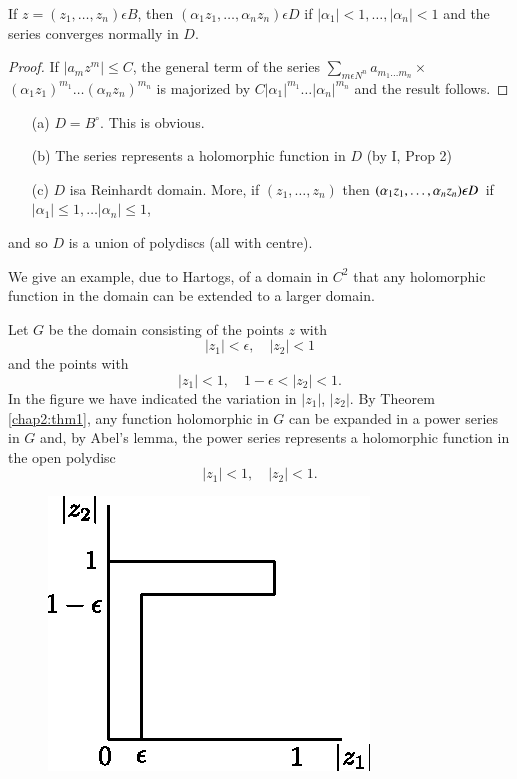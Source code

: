\medskip
{}
If $z = (z_1, \ldots, z_n) \epsilon B$, then $(\alpha_1 z_1, \ldots,
\alpha_n z_n) \epsilon D$ if $|\alpha_1|<1, \ldots, |\alpha_n|<1$ and the
series converges normally in $D$. 

\begin{proof}
If $|a_m z^m| \leq C$, the general term of the series
$\sum\limits_{m\epsilon N^n} a_{m_1 \ldots m_n} \times$\break $(\alpha_1 z_1)^{m_1}
\ldots (\alpha_n z_n)^{m_n}$ is majorized by $C|\alpha_1|^{m_1} \ldots
|\alpha_n|^{m_n}$ and the result follows.
\end{proof}

\medskip
{}
\begin{itemize}
\item[(a)] $D = B^\circ$. This is obvious.

\item[(b)] The series represents a holomorphic function in $D$ (by I, Prop 2)

\item[(c)] $D$ is\pageoriginale a Reinhardt domain. More, if $(z_1,
  \ldots, z_n)$ then $(\alpha_1 z_1, \ldots,\break\alpha_n z_n)\epsilon D$ if
  $|\alpha_1| \leq 1, \ldots |\alpha_n| \leq 1$,  
\end{itemize}
and so $D$ is a union of polydiscs (all with centre).

We give an example, due to Hartogs, of a domain in $C^2$ that any
holomorphic function in the domain can be extended to a larger domain.

Let $G$ be the domain consisting of the points $z$ with
$$
|z_1| < \epsilon, \quad |z_2| < 1 
$$
and the points with 
$$
|z_1| < 1, \quad 1-\epsilon < |z_2| <1.
$$
In the figure we have indicated the variation in $|z_1|$, $|z_2|$. By
Theorem \ref{chap2:thm1}, any function holomorphic in $G$  can be
expanded in a power 
series in $G$ and, by Abel's lemma, the power series represents a
holomorphic function in the open polydisc
$$
|z_1| < 1, \quad |z_2| <1.
$$
\begin{figure}[H]
\centering
\includegraphics{figures/fig1.eps}
\end{figure}

